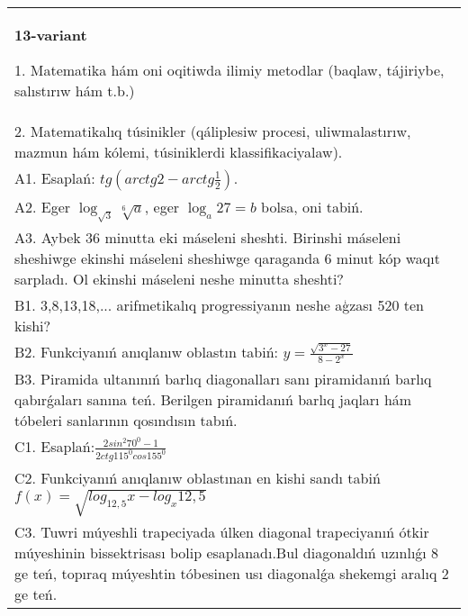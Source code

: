 \documentclass{article}
\begin{document}
\begin{tabular}{m{17cm}}
\textbf{13-variant}

1. Matematika hám oni oqitiwda ilimiy metodlar (baqlaw, tájiriybe, salıstırıw hám t.b.) \\
2. Matematikalıq túsinikler (qáliplesiw procesi, uliwmalastırıw, mazmun hám kólemi, túsiniklerdi klassifikaciyalaw). \\
A1. Esaplań: \(tg\left(arctg2 - arctg\frac{1}{2} \right) \). \\
A2. Eger \(\log_{\sqrt{3}}\sqrt[6]{a}\), eger \(\log_{a}27 = b\) bolsa, oni tabiń. \\
A3. Aybek 36 minutta eki máseleni sheshti. Birinshi máseleni sheshiwge ekinshi máseleni sheshiwge qaraganda 6 minut kóp waqıt sarpladı. Ol ekinshi máseleni neshe minutta sheshti? \\
B1. 3,8,13,18,... arifmetikalıq progressiyanın neshe aģzası 520 ten kishi? \\
B2. Funkciyanıń anıqlanıw oblastın tabiń: \(y = \frac{\sqrt{3^{x} - 27}}{8 - 2^{x}}\) \\
B3. Piramida ultanınıń barlıq diagonalları sanı piramidanıń barlıq qabırǵaları sanına teń. Berilgen piramidanıń barlıq jaqları hám tóbeleri sanlarının qosındısın tabıń. \\
C1. Esaplań:\(\frac{2sin^{2}70^{0} - 1}{2ctg115^{0}cos155^{0}}\) \\
C2. Funkciyanıń anıqlanıw oblastınan en kishi sandı tabiń \(f (x) = \sqrt{log_{12,5}x - log_{x}12,5}\) \\
C3. Tuwri múyeshli trapeciyada úlken diagonal trapeciyanıń ótkir múyeshinin bissektrisası bolip esaplanadı.Bul diagonaldıń uzınlıǵı 8 ge teń, topıraq múyeshtin tóbesinen usı diagonalǵa shekemgi aralıq 2 ge teń. \\

\end{tabular}
\vspace{1cm}
\end{document}
